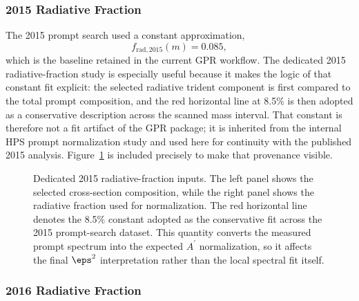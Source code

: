\subsubsection{2015 Radiative Fraction}

The 2015 prompt search used a constant approximation,
\begin{equation}
f_{\mathrm{rad},2015}(m) = 0.085,
\end{equation}
which is the baseline retained in the current GPR workflow. The dedicated 2015
radiative-fraction study is especially useful because it makes the logic of that
constant fit explicit: the selected radiative trident component is first compared to
the total prompt composition, and the red horizontal line at 8.5\% is then adopted as
a conservative description across the scanned mass interval. That constant is therefore
not a fit artifact of the GPR package; it is inherited from the internal HPS prompt
normalization study and used here for continuity with the published 2015 analysis.
Figure~\ref{fig:2015-radfrac} is included precisely to make that provenance visible.

\begin{figure}[H]
\centering
{}
\caption{Dedicated 2015 radiative-fraction inputs. The left panel shows the selected
cross-section composition, while the right panel shows the radiative fraction used for
normalization. The red horizontal line denotes the 8.5\% constant adopted as the
conservative fit across the 2015 prompt-search dataset. This quantity converts the
measured prompt spectrum into the expected $A^\prime$ normalization, so it affects the
final $\eps^2$ interpretation rather than the local spectral fit itself.}
\label{fig:2015-radfrac}
\end{figure}

\subsubsection{2016 Radiative Fraction}

